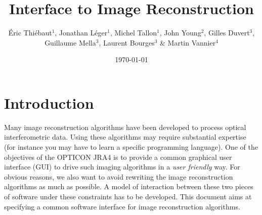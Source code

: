 \documentclass{article}
\begin{document}
\title{Interface to Image Reconstruction}

\author{Éric Thiébaut$^1$, Jonathan Léger$^1$, Michel Tallon$^1$, John
  Young$^2$, Gilles Duvert$^3$, Guillaume Mella$^3$, Laurent Bourges$^3$ \&
  Martin Vannier$^4$}



\date{\today}

\maketitle

\section{Introduction}

Many image reconstruction algorithms have been developed to process optical
interferometric data.  Using these algorithms may require substantial
expertise (for instance you may have to learn a specific programming
language). One of the objectives of the OPTICON JRA4 is to provide a common
graphical user interface (GUI) to drive such imaging algorithms in a
\emph{user friendly} way. For obvious reasons, we also want to avoid rewriting
the image reconstruction algorithms as much as possible.  A model of
interaction between these two pieces of software under these constraints has
to be developed. This document aims at specifying a common software interface
for image reconstruction algorithms.
\end{document}
